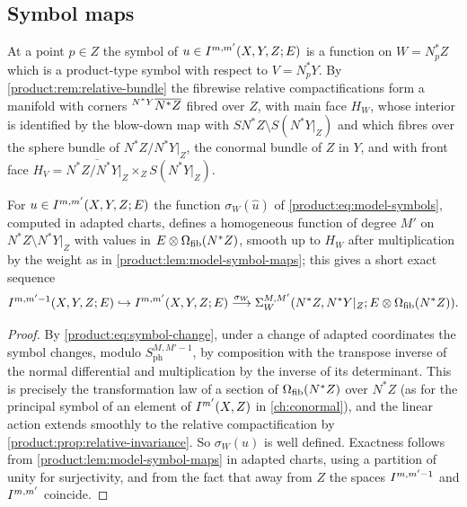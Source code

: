 \subsection{Symbol maps}
At a point $p\in Z$ the symbol of $u\in I^{m,m'}(X,Y,Z;E)$ is a function on
$W=N^*_pZ$ which is a product-type symbol with respect to $V=N^*_pY$. By
\cref{product:rem:relative-bundle} the fibrewise relative compactifications form a
manifold with corners ${}^{N^*Y}\overline{N^*Z}$ fibred over $Z$, with main face $H_W$,
whose interior is identified by the blow-down map with
$SN^*Z\setminus S(N^*Y|_Z)$ and which fibres over the sphere bundle of
$N^*Z/N^*Y|_Z$, the conormal bundle of $Z$ in $Y$, and with front face
$H_V=\overline{N^*Z/N^*Y|_Z}\times_ZS(N^*Y|_Z)$.

\begin{proposition}\label{product:prop:main-symbol}
For $u\in I^{m,m'}(X,Y,Z;E)$ the function $\sigma_W(\hat u)$ of
\eqref{product:eq:model-symbols}, computed in adapted charts, defines a
homogeneous function of degree $M'$ on $N^*Z\setminus N^*Y|_Z$ with values in
$E\otimes\Omega_{\mathrm{fib}}(N^*Z)$, smooth up to $H_W$ after multiplication by the weight
as in \cref{product:lem:model-symbol-maps}; this gives a short exact sequence
\begin{equation*}
I^{m,m'-1}(X,Y,Z;E)\hookrightarrow I^{m,m'}(X,Y,Z;E)\overset{\sigma_W}
\longrightarrow\Sigma_W^{M,M'}(N^*Z,N^*Y|_Z;E\otimes\Omega_{\mathrm{fib}}(N^*Z)).
\end{equation*}
\end{proposition}

\begin{proof}
By \eqref{product:eq:symbol-change}, under a change of adapted coordinates the
symbol changes, modulo $S^{M,M'-1}_{\mathrm{ph}}$, by composition with the
transpose inverse of the normal differential and multiplication by the inverse
of its determinant. This is precisely the transformation law of a section of
$\Omega_{\mathrm{fib}}(N^*Z)$ over $N^*Z$ (as for the principal symbol of an element of
$I^{m'}(X,Z)$ in \cref{ch:conormal}), and the linear action extends smoothly to
the relative compactification by \cref{product:prop:relative-invariance}. So
$\sigma_W(u)$ is well defined. Exactness follows from
\cref{product:lem:model-symbol-maps} in adapted charts, using a partition of unity
for surjectivity, and from the fact that away from $Z$ the spaces
$I^{m,m'-1}$ and $I^{m,m'}$ coincide.
\end{proof}

